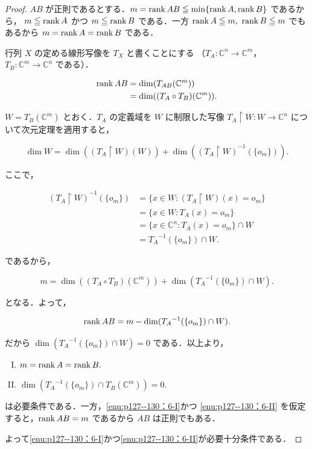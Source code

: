 \documentclass[a4paper,10pt,fleqn]{ltjsarticle}
\begin{document}
\begin{tleftbar}
    \begin{proof}
        $AB$ が正則であるとする．$m = \rank AB \leqq \min\{\rank A,\rank B \}$ であるから，
        $m \leqq \rank A$ かつ $m \leqq \rank B$ である．一方 $\rank A \leqq m,\ \rank B \leqq m$ でもあるから
        $m = \rank A = \rank B$ である．

        行列 $X$ の定める線形写像を $T_X$ と書くことにする
        （$T_A \colon  \mathbb{C}^n \to \mathbb{C}^m$，$ T_B \colon  \mathbb{C}^m \to \mathbb{C}^n$ である）．

        \begin{align*}
            \rank AB & = \dim(T_{AB}(\mathbb{C}^m))           \\
                     & = \dim((T_A \circ T_B)(\mathbb{C}^m)).
        \end{align*}

        $W = T_B(\mathbb{C}^m)$ とおく．$T_A$ の定義域を $W$ に制限した写像 $T_A \upharpoonright W : W \to \mathbb{C}^n$ について次元定理を適用すると，

        \[
            \dim W = \dim((T_A \upharpoonright W)(W)) + \dim((T_A \upharpoonright W)^{-1}(\{o_m\})).
        \]

        ここで，

        \begin{align*}
            (T_A \upharpoonright W)^{-1}(\{o_m\}) & = \{ x \in W : (T_A \upharpoonright W)(x) = o_m \} \\
                                                  & = \{ x \in W : T_A(x) = o_m \}                     \\
                                                  & = \{ x \in \mathbb{C}^n : T_A(x) = o_m \} \cap W   \\
                                                  & = {T_A}^{-1}(\{o_m\}) \cap W.
        \end{align*}

        であるから，

        \[
            m = \dim((T_A \circ T_B)(\mathbb{C}^m)) + \dim({T_A}^{-1}(\{0_m\}) \cap W).
        \]

        となる．よって，

        \[
            \rank AB = m - \dim({T_A}^{-1}(\{o_m\}) \cap W).
        \]

        だから $\dim({T_A}^{-1}(\{o_m\}) \cap W) = 0$ である．以上より，

        \begin{enumerate}[(I)]
            \item $m = \rank A = \rank B.$ \label{enu:p127--130：6-I}
            \item $\dim({T_A}^{-1}(\{o_m\}) \cap T_B(\mathbb{C}^m)) = 0.$\label{enu:p127--130：6-II}
        \end{enumerate}

        は必要条件である．一方，\ref{enu:p127--130：6-I}かつ \ref{enu:p127--130：6-II} を仮定すると，$\rank AB = m$ であるから $AB$ は正則でもある．

        よって\ref{enu:p127--130：6-I}かつ\ref{enu:p127--130：6-II}が必要十分条件である．
    \end{proof}
\end{tleftbar}
\end{document}
